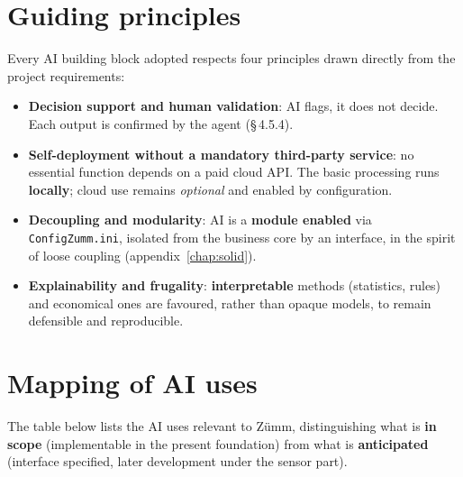 \section{Guiding principles}
Every AI building block adopted respects four principles drawn directly from the
project requirements:
\begin{itemize}
  \item \textbf{Decision support and human validation}: AI flags, it does not
        decide. Each output is confirmed by the agent (§\,4.5.4).
  \item \textbf{Self-deployment without a mandatory third-party service}: no
        essential function depends on a paid cloud API. The basic processing
        runs \textbf{locally}; cloud use remains \emph{optional} and enabled by
        configuration.
  \item \textbf{Decoupling and modularity}: AI is a \textbf{module enabled} via
        \texttt{ConfigZumm.ini}, isolated from the business core by an
        interface, in the spirit of loose coupling (appendix~\ref{chap:solid}).
  \item \textbf{Explainability and frugality}: \textbf{interpretable} methods
        (statistics, rules) and economical ones are favoured, rather than opaque
        models, to remain defensible and reproducible.
\end{itemize}

\section{Mapping of AI uses}
The table below lists the AI uses relevant to Zümm, distinguishing what is
\textbf{in scope} (implementable in the present foundation) from what is
\textbf{anticipated} (interface specified, later development under the sensor
part).

